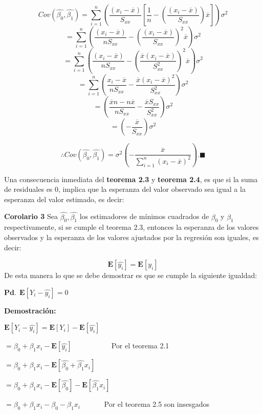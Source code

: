 \documentclass[
  a4paper,
  oneside,
  openany]{book}
\begin{document}
\[Cov\left(\hat{\beta_{0}},\hat{\beta_{1}}\right)=\sum_{i=1}^{n}\left(\frac{(x_{i}-\overline{x})}{S_{xx}}\left[\frac{1}{n}-\left(\frac{(x_{i}-\overline{x})}{S_{xx}}\right)\overline{x}\right]\right)\sigma^2\]
\[=\sum_{i=1}^{n}\left(\frac{(x_{i}-\overline{x})}{nS_{xx}}-\left(\frac{(x_{i}-\overline{x})}{S_{xx}}\right)^2\overline{x}\right)\sigma^2\]
\[=\sum_{i=1}^{n}\left(\frac{(x_{i}-\overline{x})}{nS_{xx}}-\left(\frac{\overline{x}(x_{i}-\overline{x})}{S^2_{xx}}\right)^2\overline{x}\right)\sigma^2\]
\[=\sum_{i=1}^{n}\left(\frac{x_{i}-\overline{x}}{nS_{xx}}-\frac{\overline{x}(x_{i}-\overline{x})^2}{S^2_{xx}}\right)\sigma^2\]
\[=\left(\frac{\overline{x}n -n\overline{x}}{nS_{xx}}-\frac{\overline{x}S_{xx}}{S^2_{xx}}\right)\sigma^2\]
\[=\left(-\frac{\overline{x}}{S_{xx}}\right)\sigma^2\]

\[\therefore Cov\left(\hat{\beta_{0}},\hat{\beta_{1}}\right)=\sigma^2\left(-\frac{\overline{x}}{\sum_{i=1}^{n}(x_{i}-\overline{x})^2}\right).\blacksquare\]

Una consecuencia inmediata del \textbf{teorema 2.3} y \textbf{teorema 2.4}, es que si la suma de residuales es 0, implica que la esperanza del valor observado sea igual a la esperanza del valor estimado, es decir:

\textbf{Corolario 3} Sea \(\hat{\beta_{0}},\hat{\beta_{1}}\) los estimadores de mínimos cuadrados de \(\beta_{0}\) y \(\beta_{1}\) respectivamente, si se cumple el teorema 2.3, entonces la esperanza de los valores observados y la esperanza de los valores ajustados por la regresión son iguales, es decir:

\[\mathbf{E}\left[\hat{y_{i}}\right]=\mathbf{E}\left[ y_{i} \right]\]
De esta manera lo que se debe demostrar es que se cumple la siguiente igualdad:

\(\mathbf{Pd.} \ \ \mathbf{E}\left[ Y_{i}-\hat{y_{i}}\right]=0\)

\textbf{Demostración:}

\(\mathbf{E}\left[ Y_{i}-\hat{y_{i}}\right]=\mathbf{E}\left[ Y_{i}\right]-\mathbf{E}\left[\hat{y_{i}}\right]\)

\(=\beta_{0}+\beta_{1}x_{i}-\mathbf{E}\left[\hat{y_{i}}\right]\) ~~~ ~~~ ~~~Por el teorema 2.1

\(=\beta_{0}+\beta_{1}x_{i}-\mathbf{E}\left[ \hat{\beta_{0}}+\hat{\beta_{1}}x_{i}\right]\)

\(=\beta_{0}+\beta_{1}x_{i}-\mathbf{E}\left[ \hat{\beta_{0}}\right]-\mathbf{E}\left[\hat{\beta_{1}}x_{i}\right]\)

\(=\beta_{0}+\beta_{1}x_{i}-\beta_{0}-\beta_{1}x_{i}\) ~~~~~~Por el teorema 2.5 son insesgados
\end{document}
